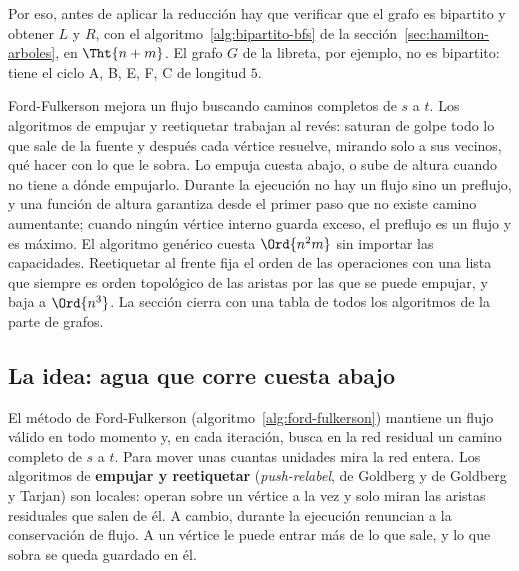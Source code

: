 \documentclass[11pt,letterpaper]{article}
\begin{document}
Por eso, antes de aplicar la reducción hay que verificar que el grafo
es bipartito y obtener $L$ y $R$, con el
algoritmo~\ref{alg:bipartito-bfs} de la
sección~\ref{sec:hamilton-arboles}, en $\Tht{n + m}$. El grafo $G$ de
la libreta, por ejemplo, no es bipartito: tiene el ciclo
A, B, E, F, C de longitud $5$.

\newpage


\label{sec:push-relabel}

\begin{quick_sum}
  Ford-Fulkerson mejora un flujo buscando caminos completos de $s$ a
  $t$. Los algoritmos de empujar y reetiquetar trabajan al revés:
  saturan de golpe todo lo que sale de la fuente y después cada
  vértice resuelve, mirando solo a sus vecinos, qué hacer con lo que le
  sobra. Lo empuja cuesta abajo, o sube de altura cuando no tiene a
  dónde empujarlo. Durante la ejecución no hay un flujo sino un
  preflujo, y una función de altura garantiza desde el primer paso que
  no existe camino aumentante; cuando ningún vértice interno guarda
  exceso, el preflujo es un flujo y es máximo. El algoritmo genérico
  cuesta $\Ord{n^2 m}$ sin importar las capacidades. Reetiquetar al
  frente fija el orden de las operaciones con una lista que siempre es
  orden topológico de las aristas por las que se puede empujar, y baja
  a $\Ord{n^3}$. La sección cierra con una tabla de todos los
  algoritmos de la parte de grafos.
\end{quick_sum}


\subsection*{La idea: agua que corre cuesta abajo}

El método de Ford-Fulkerson (algoritmo~\ref{alg:ford-fulkerson})
mantiene un flujo válido en todo momento y, en cada iteración, busca en
la red residual un camino completo de $s$ a $t$. Para mover unas
cuantas unidades mira la red entera. Los algoritmos de
\textbf{empujar y reetiquetar} (\textit{push-relabel}, de Goldberg y de
Goldberg y Tarjan) son locales: operan sobre un vértice a la vez y solo
miran las aristas residuales que salen de él. A cambio, durante la
ejecución renuncian a la conservación de flujo. A un vértice le puede
entrar más de lo que sale, y lo que sobra se queda guardado en él.
\end{document}
